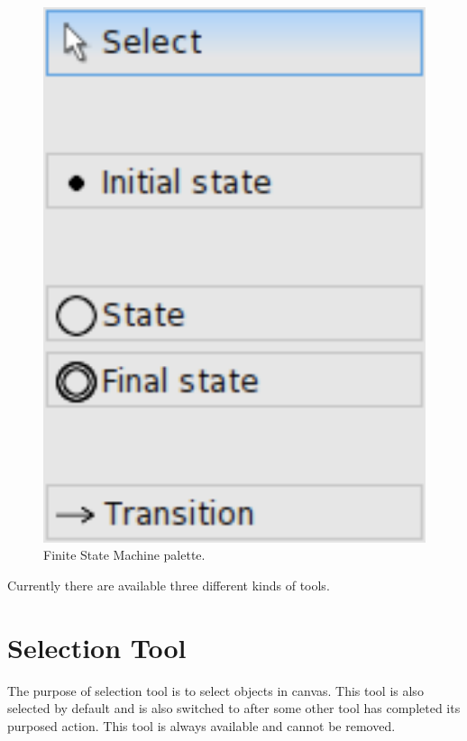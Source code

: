 \documentclass[a4paper,10pt,twoside]{book}
\begin{document}
\begin{figure}

\begin{center}
\includegraphics[width=1.0\textwidth]{../figures/palette-example.png}\caption{Finite State Machine palette.\label{../figures/palette-example.png}}\end{center}
\end{figure}


Currently there are available three different kinds of tools.
\section{ Selection Tool}
The purpose of selection tool is to select objects in canvas. This tool is also selected by default and is also switched to after some other tool has completed its purposed action.
This tool is always available and cannot be removed.
\end{document}
